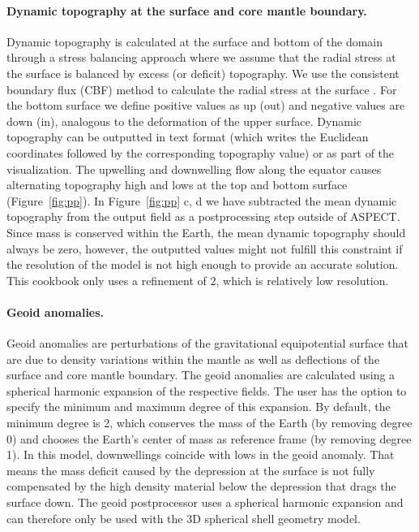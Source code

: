 \documentclass{article}
\newcommand{\aspect}{\textsc{ASPECT}}
\begin{document}
\paragraph{Dynamic topography at the surface and core mantle boundary.}
Dynamic topography is calculated at the surface and bottom of the domain
through a stress balancing approach where we assume that the radial stress at
the surface is balanced by excess (or deficit) topography. We use the
consistent boundary flux (CBF) method to calculate the radial stress
at the surface \cite{ZGH93}. For the
bottom surface we define positive values as up (out)
and negative values are down (in), analogous to the deformation of the upper
surface. Dynamic topography can be outputted in text format (which writes the
Euclidean coordinates followed by the corresponding topography value) or as
part of the visualization. The upwelling and downwelling flow along the
equator causes alternating topography high and lows at the top and
bottom surface (Figure~\ref{fig:pp}).
In Figure~\ref{fig:pp} c, d we have subtracted the mean dynamic topography from
the output field as a postprocessing step outside of \aspect{}. Since mass is
conserved within the Earth, the mean dynamic topography
should always be zero, however, the outputted values might not fulfill this
constraint if the resolution of the model is not high enough to provide an
accurate solution. This cookbook only uses a refinement of 2, which is relatively
low resolution.

\paragraph{Geoid anomalies.}
Geoid anomalies are perturbations of the gravitational equipotential surface that
are due to density variations within the mantle as well as deflections of the
surface and core mantle boundary. The geoid anomalies are calculated using a spherical
harmonic expansion of the respective fields. The user has the option to specify the
minimum and maximum degree of this expansion. By default, the minimum degree is
2, which conserves the mass of the Earth (by removing degree 0) and chooses the
Earth's center of mass as reference frame (by removing degree 1).
In this model, downwellings coincide with lows in the geoid anomaly. That
means the mass deficit caused by the depression at the surface is not
fully compensated by the high density material below the depression that
drags the surface down. The geoid postprocessor uses a spherical harmonic
expansion and can therefore only be used with the 3D spherical shell geometry model.
\end{document}
